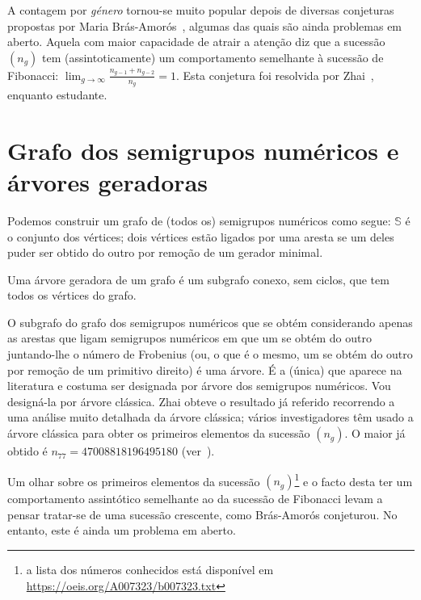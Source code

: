 \documentclass[12pt,a4paper]{article}
\numberwithin{table}{section}
\numberwithin{figure}{section}
\numberwithin{equation}{section}
\theoremstyle{definition}
\theoremstyle{remark}
\begin{document}
A contagem por \emph{género} tornou-se muito popular depois de diversas conjeturas propostas por Maria Brás-Amorós~\cite{Bras-Amoros2008SF-Fibonacci}, algumas das quais são ainda problemas em aberto.
Aquela com maior capacidade de atrair a atenção diz que a sucessão \(\left(n_g\right)\) tem (assintoticamente) um comportamento semelhante à sucessão de Fibonacci: \(\lim_{g\to \infty} \frac{n_{g-1}+n_{g-2}}{n_g} = 1\).
Esta conjetura foi resolvida por Zhai~\cite{Zhai2013SF-Fibonacci}, enquanto estudante. 



\section{Grafo dos semigrupos numéricos e árvores geradoras}\label{sec:NSgraph}

Podemos construir um grafo de (todos os) semigrupos numéricos como segue: \(\mathbb{S}\) é o conjunto dos vértices; dois vértices estão ligados por uma aresta se um deles puder ser obtido do outro por remoção de um gerador minimal.

Uma árvore geradora de um grafo é um subgrafo conexo, sem ciclos, que tem todos os vértices do grafo.

O subgrafo do grafo dos semigrupos numéricos que se obtém considerando apenas as arestas que ligam semigrupos numéricos em que um se obtém do outro juntando-lhe o número de Frobenius (ou, o que é o mesmo, um se obtém do outro por remoção de um primitivo direito) é uma árvore. É a (única) que aparece na literatura e costuma ser designada por árvore dos semigrupos numéricos. Vou designá-la por árvore clássica. Zhai obteve o resultado já referido recorrendo a uma análise muito detalhada da árvore clássica; vários investigadores têm usado a árvore clássica para obter os primeiros elementos da sucessão \(\left(n_g\right)\). O maior já obtido é \(n_{77} = \num{47008818196495180}\) (ver~\cite{oeis_ns_counting_genus}).

Um olhar sobre os primeiros elementos da sucessão \(\left(n_g\right)\)\footnote{a lista dos números conhecidos está disponível em \url{https://oeis.org/A007323/b007323.txt}} e o facto desta ter um comportamento assintótico semelhante ao da sucessão de Fibonacci levam a  pensar tratar-se de uma sucessão crescente, como Brás-Amorós conjeturou. No entanto, este é ainda um problema em aberto.
\end{document}
